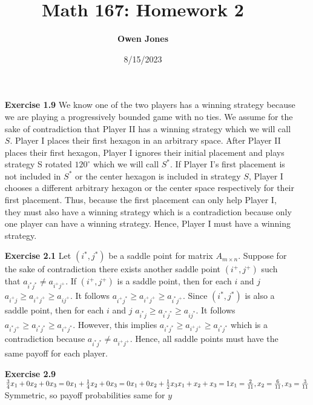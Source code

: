 \documentclass[10pt]{article}
\title{\bf Math 167: Homework 2}
\date{8/15/2023}
\author{\bf Owen Jones}
\begin{document}
\maketitle

\begin{itemize}
    \item [\textbf{Exercise 1.9}] We know one of the two players has a winning strategy because we are playing a progressively bounded game with no ties. 
    We assume for the sake of contradiction that Player II has a winning strategy which we will call $S$. 
    Player I places their first hexagon in an arbitrary space.
    After Player II places their first hexagon, Player I ignores their initial placement and plays strategy S rotated $120^\circ$ which we will call $S^*$. 
    If Player I's first placement is not included in $S^*$ or the center hexagon is included in strategy $S$, Player I chooses a different arbitrary hexagon or the center space respectively for their first placement.
    Thus, because the first placement can only help Player I, they must also have a winning strategy which is a contradiction because only one player can have a winning strategy. Hence, Player I must have a winning strategy.
    \item [\textbf{Exercise 2.1}] Let $(i^*,j^*)$ be a saddle point for matrix $A_{m\times n}$. 
    Suppose for the sake of contradiction there exists another saddle point $(i^+,j^+)$ such that $a_{i^*j^*}\neq a_{i^+j^+}$.
    If $(i^+,j^+)$ is a saddle point, then for each $i$ and $j$ $a_{i^+j}\ge a_{i^+j^+}\ge a_{ij^+}$. It follows $a_{i^+j^*}\ge a_{i^+j^+}\ge a_{i^*j^+}$. Since $(i^*,j^*)$ is also a saddle point, then for each $i$ and $j$ $a_{i^*j}\ge a_{i^*j^*}\ge a_{ij^*}$. It follows $a_{i^*j^+}\ge a_{i^*j^*}\ge a_{i^+j^*}$. However, this implies $a_{i^*j^*}\ge a_{i^+j^+}\ge a_{i^*j^*}$ which is a contradiction because $a_{i^*j^*}\neq a_{i^+j^+}$.
    Hence, all saddle points must have the same payoff for each player.
    \item [\textbf{Exercise 2.9}] 
    $\frac{3}{4}x_1+0x_2+0x_3=0x_1+\frac{1}{4}x_2+0x_3=0x_1+0x_2+\frac{1}{2}x_3\\
    x_1+x_2+x_3=1\\
    x_1=\frac{2}{11},x_2=\frac{6}{11},x_3=\frac{3}{11}$\\
    Symmetric, so payoff probabilities same for $y$\\
    


\end{itemize}
\end{document}
